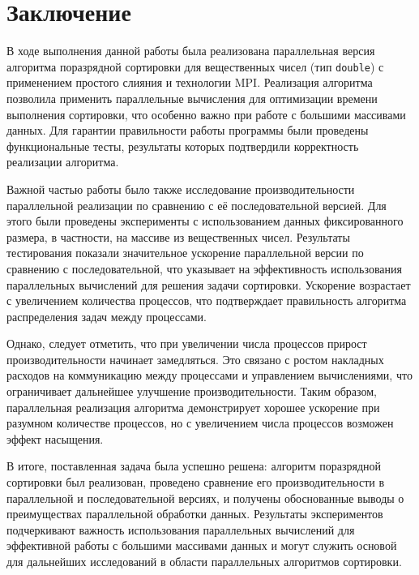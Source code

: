 \documentclass[12pt]{article}
\begin{document}
\section{Заключение}

\hspace*{1.25em}В ходе выполнения данной работы была реализована параллельная версия алгоритма поразрядной сортировки для вещественных чисел (тип \texttt{double}) с применением простого слияния и технологии MPI. Реализация алгоритма позволила применить параллельные вычисления для оптимизации времени выполнения сортировки, что особенно важно при работе с большими массивами данных. Для гарантии правильности работы программы были проведены функциональные тесты, результаты которых подтвердили корректность реализации алгоритма.

Важной частью работы было также исследование производительности параллельной реализации по сравнению с её последовательной версией. Для этого были проведены эксперименты с использованием данных фиксированного размера, в частности, на массиве из вещественных чисел. Результаты тестирования показали значительное ускорение параллельной версии по сравнению с последовательной, что указывает на эффективность использования параллельных вычислений для решения задачи сортировки. Ускорение возрастает с увеличением количества процессов, что подтверждает правильность алгоритма распределения задач между процессами.

Однако, следует отметить, что при увеличении числа процессов прирост производительности начинает замедляться. Это связано с ростом накладных расходов на коммуникацию между процессами и управлением вычислениями, что ограничивает дальнейшее улучшение производительности. Таким образом, параллельная реализация алгоритма демонстрирует хорошее ускорение при разумном количестве процессов, но с увеличением числа процессов возможен эффект насыщения.

В итоге, поставленная задача была успешно решена: алгоритм поразрядной сортировки был реализован, проведено сравнение его производительности в параллельной и последовательной версиях, и получены обоснованные выводы о преимуществах параллельной обработки данных. Результаты экспериментов подчеркивают важность использования параллельных вычислений для эффективной работы с большими массивами данных и могут служить основой для дальнейших исследований в области параллельных алгоритмов сортировки.
\end{document}
